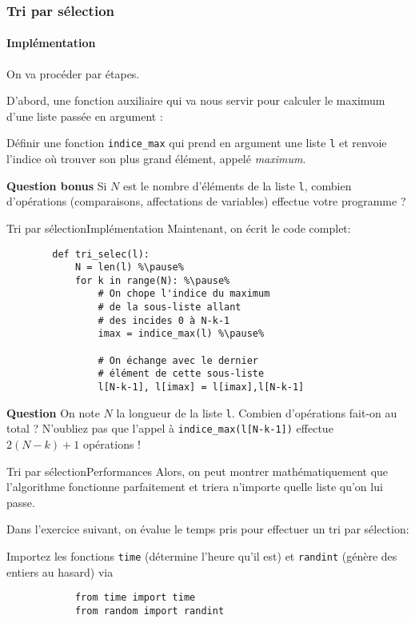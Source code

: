 \begin{frame}
	\frametitle{Tri par sélection}
	\framesubtitle{Implémentation}
	
	On va procéder par étapes.\pause
	
	D'abord, une fonction auxiliaire qui va nous servir pour calculer le maximum d'une liste passée en argument :\pause
	
	\begin{exo}
		Définir une fonction \lstinline|indice_max| qui prend en argument une liste \lstinline|l| et renvoie l'indice où trouver son plus grand élément, appelé \textit{maximum}.
		
		\textbf{Question bonus} Si $N$ est le nombre d'éléments de la liste \lstinline|l|, combien d'opérations (comparaisons, affectations de variables) effectue votre programme ?
	\end{exo}
\end{frame}

\begin{frame}[fragile]{Tri par sélection}{Implémentation}
	Maintenant, on écrit le code complet:\pause
	
	\begin{lstlisting}
		def tri_selec(l):
			N = len(l) %\pause%
			for k in range(N): %\pause%
				# On chope l'indice du maximum
				# de la sous-liste allant
				# des incides 0 à N-k-1
				imax = indice_max(l) %\pause%
				
				# On échange avec le dernier
				# élément de cette sous-liste
				l[N-k-1], l[imax] = l[imax],l[N-k-1]
	\end{lstlisting}
	
	\textbf{Question} On note $N$ la longueur de la liste \lstinline|l|. Combien d'opérations fait-on au total ? N'oubliez pas que l'appel à \lstinline|indice_max(l[N-k-1])| effectue $2(N-k)+1$ opérations ! 
\end{frame}

\begin{frame}[fragile]{Tri par sélection}{Performances}
	Alors, on peut montrer mathématiquement que l'algorithme fonctionne parfaitement et triera n'importe quelle liste qu'on lui passe.\pause
	
	Dans l'exercice suivant, on évalue le temps pris pour effectuer un tri par sélection:\pause
	
	\begin{exo}
		Importez les fonctions \lstinline|time| (détermine l'heure qu'il est) et \lstinline|randint| (génère des entiers au hasard) via \begin{lstlisting}
			from time import time
			from random import randint
		\end{lstlisting}
	\end{exo}	
\end{frame}

